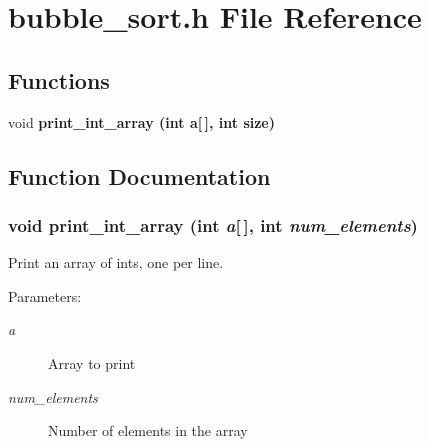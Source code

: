 \section{bubble\_\-sort.h File Reference}
\label{bubble__sort_8h}
\subsection*{Functions}
\begin{CompactItemize}
\item 
void \bf{print\_\-int\_\-array} (int a[$\,$], int size)
\end{CompactItemize}


\subsection{Function Documentation}
\subsubsection{\setlength{\rightskip}{0pt plus 5cm}void print\_\-int\_\-array (int {\em a}[$\,$], int {\em num\_\-elements})}\label{bubble__sort_8h_a5e6807121f9ade71432e51859d75c92}


Print an array of ints, one per line. \begin{Desc}
\item[Parameters:]
\begin{description}
\item[{\em a}]Array to print \item[{\em num\_\-elements}]Number of elements in the array \end{description}
\end{Desc}
